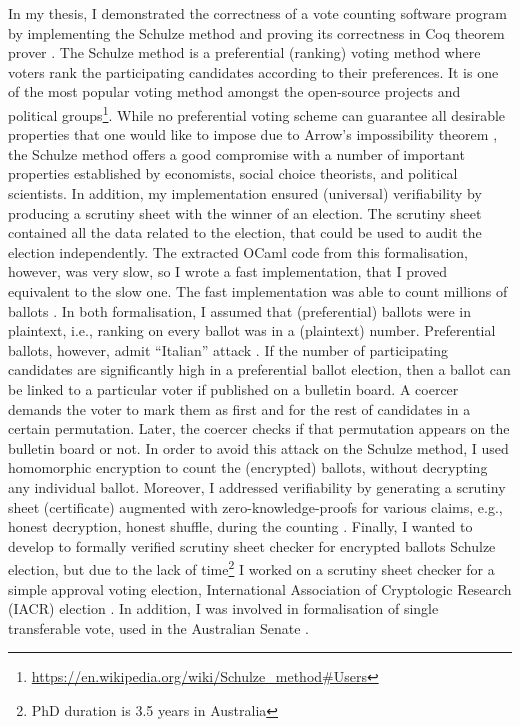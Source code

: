 \documentclass[a4paper]{article}
\begin{document}
In my thesis, I demonstrated the correctness of a vote counting software program 
by implementing the Schulze method and proving its correctness in Coq theorem 
prover \cite{10.1007/978-3-319-66107-0_26}. 
The Schulze method is a preferential (ranking) voting method where voters rank the participating 
candidates according to their preferences. It is one of the most popular voting method amongst the open-source projects and 
political groups\footnote{\url{https://en.wikipedia.org/wiki/Schulze_method#Users}}.
While no preferential voting scheme can guarantee all
desirable properties that one would like to impose due to Arrow's impossibility theorem \cite{arrow1950difficulty}, 
the Schulze method offers a good compromise with a number of important properties established by economists, 
social choice theorists, and political scientists.  In addition, my implementation 
ensured (universal) verifiability by producing a scrutiny sheet 
with the winner of an election. The scrutiny sheet contained all the data related 
to the election, that could be used to audit the election independently. 
The extracted OCaml code from this formalisation, however, was 
very slow, so I wrote a fast implementation, that I proved equivalent to the slow one.
The fast implementation was able to count millions of ballots \cite{bennett2017no}.
In both formalisation, I assumed that (preferential) ballots were in plaintext, i.e., 
ranking on every ballot was in a (plaintext) number.  Preferential ballots, 
however, admit ``Italian'' attack \cite{Otten, Benaloh:2009:SSC}. 
If the number of participating candidates are significantly high in 
a preferential ballot election,
then a ballot can be linked to a particular voter if published on a bulletin board.
A coercer demands the voter to mark them as first and for the rest of candidates
in a certain permutation. Later, the coercer checks if that permutation appears 
on the bulletin board or not. In order to
avoid this attack on the Schulze method, I used homomorphic encryption to count the (encrypted) ballots, without decrypting 
any individual ballot. Moreover, I addressed verifiability by generating a scrutiny sheet (certificate) 
augmented with zero-knowledge-proofs for various claims, e.g., honest decryption, honest shuffle,  
during the counting \cite{10.1007/978-3-030-41600-3_4}. 
Finally, I wanted to develop to formally 
verified scrutiny sheet checker for encrypted ballots Schulze election, but due to the lack of 
time\footnote{PhD duration is 3.5 years in Australia} I worked on a scrutiny sheet checker for a simple approval voting election,
International Association of Cryptologic Research (IACR) election \cite{10.1145/3319535.3354247}.
In addition, I was involved in formalisation of single transferable vote, used in the Australian Senate
\cite{10.1007/978-3-030-00419-4_4}.
\end{document}
